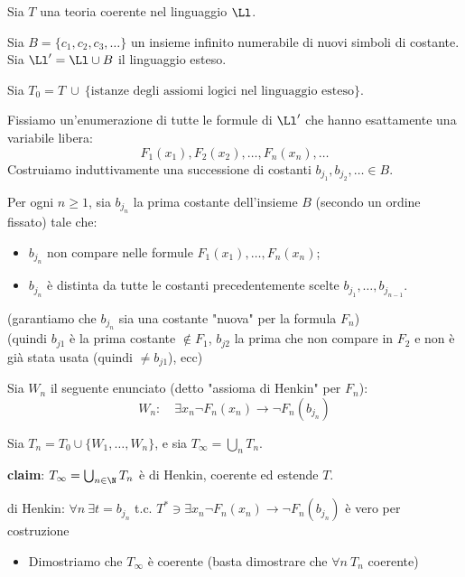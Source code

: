 \documentclass[a4paper,11pt]{report}
\begin{document}
\begin{proofframe}{}{}
    Sia \( T \) una teoria coerente nel linguaggio \( \Ll \).

    Sia \( B = \{c_1, c_2, c_3, \dots\} \) un insieme infinito numerabile di nuovi simboli di costante.
    Sia \( \Ll' = \Ll \cup B \) il linguaggio esteso.

    Sia \( T_0  = T \ \cup \ \{\text{istanze degli assiomi logici nel linguaggio esteso}\}\).

    Fissiamo un'enumerazione di tutte le formule di \( \Ll' \) che hanno esattamente una variabile libera: 
    \[ F_1(x_1), F_2(x_2), \dots, F_n(x_n), \dots \]
Costruiamo induttivamente una successione di costanti \( b_{j_1}, b_{j_2}, \dots \in B \).

    Per ogni \( n \ge 1 \), sia \( b_{j_n} \) la prima costante dell'insieme \( B \) (secondo un ordine fissato) tale che:
    \begin{itemize}
        \item \( b_{j_n} \) non compare nelle formule \( F_1(x_1), \dots, F_n(x_n) \);
        \item \( b_{j_n} \) è distinta da tutte le costanti precedentemente scelte \( b_{j_1}, \dots, b_{j_{n-1}} \).
    \end{itemize}
    
    {\small \color{gray}(garantiamo che \( b_{j_n} \) sia una costante "nuova" per la formula \( F_n \))}\\
    {\small \color{gray} (quindi \( b_{j1} \) è la prima costante \( \not \in F_1\), \( b_{j2} \) la prima che non compare in \( F_2 \) e non è già stata usata (quindi \( \neq b_{j1} \)), ecc)}

    Sia \( W_n \) il seguente enunciato (detto "assioma di Henkin" per \( F_n \)):
    \[ W_n: \quad \exists x_n \neg F_n(x_n) \to \neg F_n(b_{j_n}) \]

    Sia \( T_n = T_0 \cup \{W_1, \dots, W_n\} \), e sia \( T_{\infty} = \bigcup_n T_n \).

    \textbf{claim}: \( T_{\infty} = \bigcup_{n\in \N} T_n \) è di Henkin, coerente ed estende \( T \).

{\color{CadetBlue} di Henkin: \( \forall n \ \exists t = b_{j_n} \) t.c. \( T^* \ni \exists x_n \neg F_n(x_n) \to \neg F_n (b_{j_n})\) è vero per costruzione}

    \begin{itemize}
        \item Dimostriamo che \( T_\infty \) è coerente (basta dimostrare che \( \forall n \ T_n \) coerente)
    \end{itemize}


\end{proofframe}
\end{document}
